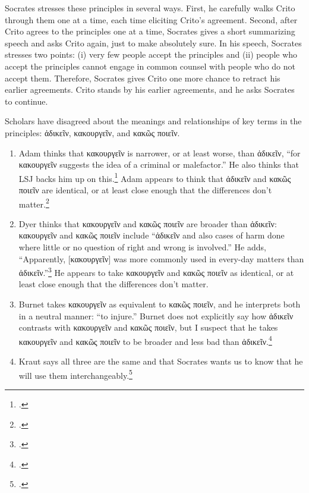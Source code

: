 \documentclass[12pt,letterpaper]{article}
\begin{document}
Socrates stresses these principles in several ways. First, he carefully walks Crito through them one at a time, each time eliciting Crito's agreement. Second, after Crito agrees to the principles one at a time, Socrates gives a short summarizing speech and asks Crito again, just to make absolutely sure. In his speech, Socrates stresses two points: (i) very few people accept the principles and (ii) people who accept the principles cannot engage in common counsel with people who do not accept them. Therefore, Socrates gives Crito one more chance to retract his earlier agreements. Crito stands by his earlier agreements, and he asks Socrates to continue.

Scholars have disagreed about the meanings and relationships of key terms in the principles: \textgreek{ἀδικεῖν}, \textgreek{κακουργεῖν}, and \textgreek{κακῶς ποιεῖν}.

\begin{enumerate}
    \item Adam thinks that \textgreek{κακουργεῖν} is narrower, or at least worse, than \textgreek{ἀδικεῖν}, ``for \textgreek{κακουργεῖν} suggests the idea of a criminal or malefactor.'' He also thinks that LSJ backs him up on this.\footcite[][on 49c3]{adam1988-crito} Adam appears to think that \textgreek{ἀδικεῖν} and \textgreek{κακῶς ποιεῖν} are identical, or at least close enough that the differences don't matter.\footcite[This is how I understand his reference to \textit{Republic} 335b, where ``\textgreek{ἀδικεῖν} is identified with \textgreek{κακοὺς ποιεῖν} rather than \textgreek{κακῶς ποιεῖν} through the middle term \textgreek{βλάπτειν}.''][on 49c7]{adam1988-crito}
    \item Dyer thinks that \textgreek{κακουργεῖν} and \textgreek{κακῶς ποιεῖν} are broader than \textgreek{ἀδικεῖν}: \textgreek{κακουργεῖν} and \textgreek{κακῶς ποιεῖν} include ``\textgreek{ἀδικεῖν} and also cases of harm done where little or no question of right and wrong is involved.'' He adds, ``Apparently, [\textgreek{κακουργεῖν}] was more commonly used in every-day matters than \textgreek{ἀδικεῖν}.''\footcite[][on 49c2]{dyer-apology-crito-2007} He appears to take \textgreek{κακουργεῖν} and \textgreek{κακῶς ποιεῖν} as identical, or at least close enough that the differences don't matter.
    \item Burnet takes \textgreek{κακουργεῖν} as equivalent to \textgreek{κακῶς ποιεῖν}, and he interprets both in a neutral manner: ``to injure.'' Burnet does not explicitly say how \textgreek{ἀδικεῖν} contrasts with \textgreek{κακουργεῖν} and \textgreek{κακῶς ποιεῖν}, but I suspect that he takes \textgreek{κακουργεῖν} and \textgreek{κακῶς ποιεῖν} to be broader and less bad than \textgreek{ἀδικεῖν}.\footcite[][on49c2]{burnet1924-euthyphro-apology-crito}
    \item Kraut says all three are the same and that Socrates wants us to know that he will use them interchangeably.\footcite[][27--28]{kraut-socrates-state-1984}
\end{enumerate}
\end{document}
